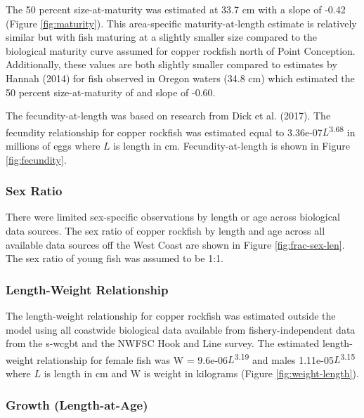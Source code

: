 \documentclass[11pt,
  english,
  letterpaper,
]{article}
\begin{document}
The 50 percent size-at-maturity was estimated at 33.7 cm with a slope of -0.42 (Figure \ref{fig:maturity}). This area-specific maturity-at-length estimate is relatively similar but with fish maturing at a slightly smaller size compared to the biological maturity curve assumed for copper rockfish north of Point Conception. Additionally, these values are both slightly smaller compared to estimates by Hannah (2014) for fish observed in Oregon waters (34.8 cm) which estimated the 50 percent size-at-maturity of and slope of -0.60.

The fecundity-at-length was based on research from Dick et al. (2017). The fecundity relationship for copper rockfish was estimated equal to 3.36e-07\(L\)\textsuperscript{3.68} in millions of eggs where \(L\) is length in cm. Fecundity-at-length is shown in Figure \ref{fig:fecundity}.

\hypertarget{sex-ratio}{%
\subsubsection{Sex Ratio}\label{sex-ratio}}

There were limited sex-specific observations by length or age across biological data sources. The sex ratio of copper rockfish by length and age across all available data sources off the West Coast are shown in Figure \ref{fig:frac-sex-len}. The sex ratio of young fish was assumed to be 1:1.

\hypertarget{length-weight-relationship}{%
\subsubsection{Length-Weight Relationship}\label{length-weight-relationship}}

The length-weight relationship for copper rockfish was estimated outside the model using all coastwide biological data available from fishery-independent data from the \gls{s-wcgbt} and the NWFSC Hook and Line survey. The estimated length-weight relationship for female fish was W = 9.6e-06\(L\)\textsuperscript{3.19} and males 1.11e-05\(L\)\textsuperscript{3.15} where \(L\) is length in cm and W is weight in kilograms (Figure \ref{fig:weight-length}).

\hypertarget{length-at-age}{%
\subsubsection{Growth (Length-at-Age)}\label{length-at-age}}
\end{document}
